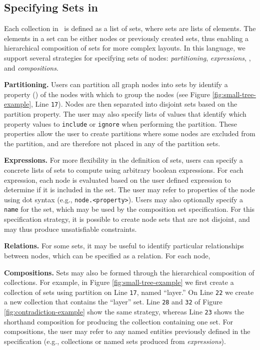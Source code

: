 \subsection{Specifying Sets in \projectname}
Each collection in \projectname\ is defined as a list of sets, where sets
are lists of elements. The elements in a set can be either nodes or
previously created sets, thus enabling a hierarchical composition of sets
for more complex layouts. In this language, we support several strategies
for specifying sets of nodes: \emph{partitioning}, \emph{expressions},
, and \emph{compositions}.

\textbf{Partitioning.} Users can partition all graph nodes into sets by
identify a property () of the nodes
with which to group the nodes (see Figure \ref{fig:small-tree-example},
Line \texttt{17}). Nodes are then separated into disjoint sets based on the
partition property. The user may also specify lists of values that identify
which property values to \texttt{include} or \texttt{ignore} when
performing the partition. These properties allow the user to create
partitions where some nodes are excluded from the partition, and are
therefore not placed in any of the partition sets.

\textbf{Expressions.} For more flexibility in the definition of sets, users
can specify a concrete lists of sets to compute using arbitrary boolean
expressions. For each expression, each node is evaluated based on the user
defined expression to determine if it is included in the set. The user may
refer to properties of the node using dot syntax (e.g.,
\texttt{node.<property>}). Users may also optionally specify a
\texttt{name} for the set, which may be used by the composition set
specification. For this specification strategy, it is possible to create
node sets that are not disjoint, and may thus produce unsatisfiable
constraints. 

\textbf{Relations.} For some sets, it may be useful to identify particular
relationships between nodes, which can be specified as a relation. For each
node, 

\contradictionExample

\textbf{Compositions.} Sets may also be formed through the hierarchical
composition of collections. For example, in Figure
\ref{fig:small-tree-example} we first create a collection of sets using
partition on Line \texttt{17}, named ``layer.'' On Line \texttt{22} we
create a new collection that contains the ``layer'' set. Line \texttt{28}
and \texttt{32} of Figure \ref{fig:contradiction-example} show the same
strategy, whereas Line \texttt{23} shows the shorthand composition for
producing the collection containing one set. For compositions, the user may
refer to any named entities previously defined in the specification (e.g.,
collections or named sets produced from \emph{expressions}).

